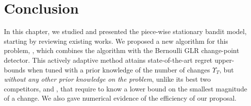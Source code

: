 \newpage
\section{Conclusion}
\label{sub:6:conclusion}

In this chapter, we studied and presented the piece-wise stationary bandit model, starting by reviewing existing works.
%
We proposed a new algorithm for this problem, \GLRklUCB, which combines the \klUCB{} algorithm with the Bernoulli GLR change-point detector. This actively adaptive method attains state-of-the-art regret upper-bounds when tuned with a prior knowledge of the number of changes $\Upsilon_T$, but \emph{without any other prior knowledge on the problem}, unlike its best two competitors, \CUSUMUCB{} and \MUCB, that require to know a lower bound on the smallest magnitude of a change. We also gave numerical evidence of the efficiency of our proposal.


